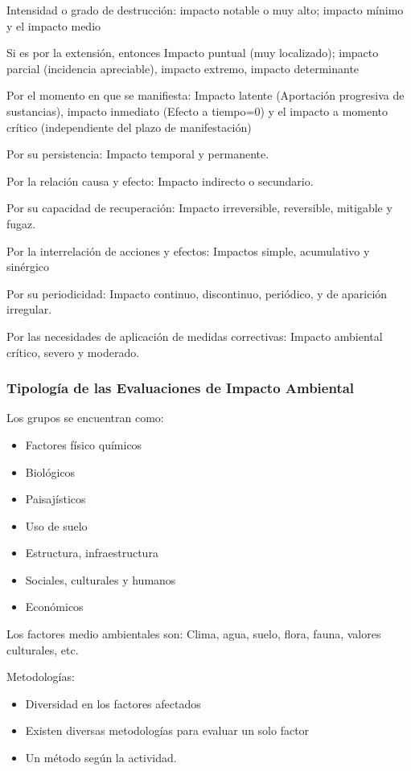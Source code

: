 Intensidad o grado de destrucción: impacto notable o muy alto; impacto mínimo y el impacto medio

Si es por la extensión, entonces Impacto puntual (muy localizado); impacto parcial (incidencia apreciable), impacto extremo, impacto determinante

Por el momento en que se manifiesta: Impacto latente (Aportación progresiva de sustancias), impacto inmediato (Efecto a tiempo=0) y el impacto a momento crítico (independiente del plazo de manifestación)

Por su persistencia: Impacto temporal y permanente.

Por la relación causa y efecto: Impacto indirecto o secundario.

Por su capacidad de recuperación: Impacto irreversible, reversible, mitigable y fugaz.

Por la interrelación de acciones y efectos: Impactos simple, acumulativo y sinérgico

Por su periodicidad: Impacto continuo, discontinuo, periódico, y de aparición irregular.

Por las necesidades de aplicación de medidas correctivas: Impacto ambiental crítico, severo y moderado.

\subsubsection{Tipología de las Evaluaciones de Impacto Ambiental}
Los grupos se encuentran como:
\begin{itemize}
    \item Factores físico químicos
    \item Biológicos
    \item Paisajísticos
    \item Uso de suelo
    \item Estructura, infraestructura
    \item Sociales, culturales y humanos
    \item Económicos
\end{itemize}
Los factores medio ambientales son: Clima, agua, suelo, flora, fauna, valores culturales, etc.

Metodologías:
\begin{itemize}
    \item Diversidad en los factores afectados
    \item Existen diversas metodologías para evaluar un solo factor
    \item Un método según la actividad.
\end{itemize}

